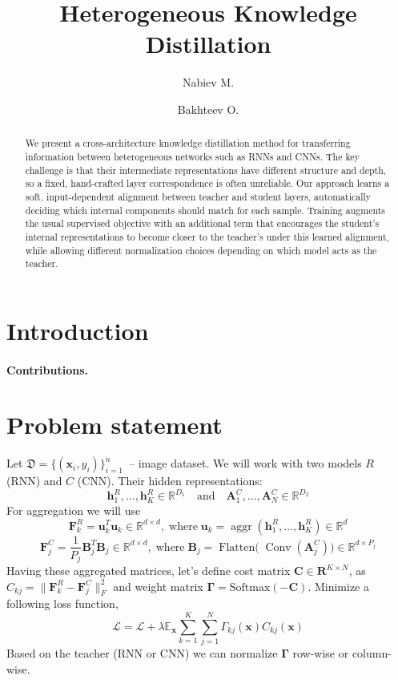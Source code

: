 \documentclass[11pt]{article}
\title{Heterogeneous Knowledge Distillation}
\author{Nabiev M. \and Bakhteev O.}
\date{}
\begin{document}
\maketitle
\begin{abstract}
We present a cross-architecture knowledge distillation method for transferring information between heterogeneous networks such as RNNs and CNNs. The key challenge is that their intermediate representations have different structure and depth, so a fixed, hand-crafted layer correspondence is often unreliable. Our approach learns a soft, input-dependent alignment between teacher and student layers, automatically deciding which internal components should match for each sample. Training augments the usual supervised objective with an additional term that encourages the student’s internal representations to become closer to the teacher’s under this learned alignment, while allowing different normalization choices depending on which model acts as the teacher. 
\end{abstract}

\section{Introduction}

\paragraph{Contributions.}


\section{Problem statement}
Let \(\mathfrak{D} = \{(\mathbf{x}_i, y_i)\}_{i=1}^n\)~-- image dataset. We will work with two models \(R\) (RNN) and \(C\) (CNN). Their hidden representations:
\[
    \mathbf{h}_1^R, \dots, \mathbf{h}_K^R \in \mathbb{R}^{D_1} \quad \text{and} \quad 
    \mathbf{A}_1^C, \dots, \mathbf{A}_N^C \in \mathbb{R}^{D_2}
\]
For aggregation we will use
\[
    \mathbf{F}_k^R = \mathbf{u}_k^T\mathbf{u}_k \in \mathbb{R}^{d\times d}, \; \text{where} \; \mathbf{u}_k = \operatorname{aggr}(\mathbf{h}^R_1, \dots, \mathbf{h}^R_K) \in \mathbb{R}^{d}
\]
\[
    \mathbf{F}_j^C = \frac{1}{P_j} \mathbf{B}_j^T \mathbf{B}_j \in \mathbb{R}^{d\times d}, \; \text{where} \; \mathbf{B}_j = \operatorname{Flatten(}\operatorname{Conv}(\mathbf{A}_j^C)) \in \mathbb{R}^{d \times P_j}
\]
Having these aggregated matrices, let's define cost matrix \(\mathbf{C}\in \mathbf{R}^{K\times N}\), as \(C_{kj} = \| \mathbf{F}_k^R - \mathbf{F}_j^C \|_F^2\) and weight matrix \(\boldsymbol{\Gamma} = \operatorname{Softmax(- \mathbf{C})}\).
Minimize a following loss function, 
\[
    \mathcal{L} = \mathcal{L} + \lambda \mathbb{E}_{\mathbf{x}} \sum_{k=1}^K \sum_{j=1}^N \Gamma_{kj}(\mathbf{x}) C_{kj}(\mathbf{x})
\]
Based on the teacher (RNN or CNN) we can normalize $\boldsymbol{\Gamma}$ row-wise or column-wise.
\end{document}
